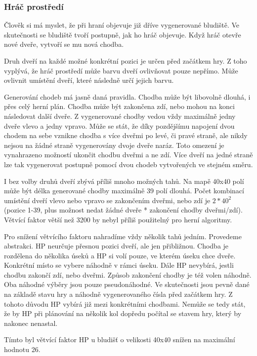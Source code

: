 \subsubsection{Hráč prostředí}

Člověk si má myslet, že při hraní objevuje již dříve vygenerované bludiště. Ve skutečnosti se bludiště tvoří postupně, jak ho hráč objevuje. Když hráč otevře nové dveře, vytvoří se mu nová chodba. 

Druh dveří na každé možné konkrétní pozici je určen před začátkem hry. Z toho vyplývá, že hráč prostředí může barvu dveří ovlivňovat pouze nepřímo. Může ovlivnit umístění dveří, které následně určí jejich barvu.

Generování chodeb má jasně daná pravidla. Chodba může být libovolně dlouhá, i přes celý herní plán. Chodba může být zakončena zdí, nebo mohou na konci následovat další dveře. Z vygenerované chodby vedou vždy maximálně jedny dveře vlevo a jedny vpravo. Může se stát, že díky pozdějšímu napojení dvou chodem na sebe vznikne chodba s více dveřmi po levé, či pravé straně, ale nikdy nejsou na žádné straně vygenerovány dvoje dveře naráz. Toto omezení je vynahrazeno možností ukončit chodbu dveřmi a ne zdí. Více dveří na jedné straně lze tak vygenerovat postupně pomocí dvou chodeb vytvořených ve stejném směru.

I bez volby druhů dveří zbývá příliš mnoho možných tahů. Na mapě 40x40 polí může být délka generované chodby maximálně 39 polí dlouhá. Počet kombinací umístění dveří vlevo nebo vpravo se zakončením dveřmi, nebo zdí je $2*40^2$ (pozice 1-39, plus možnost nedat žádné dveře * zakončení chodby dveřmi/zdí). Větvící faktor větší než 3200 by nebyl příliš použitelný pro herní algoritmy. 

Pro snížení větvícího faktoru nahradíme vždy několik tahů jedním. Provedeme abstrakci. HP neurčuje přesnou pozici dveří, ale jen přibližnou. Chodba je rozdělena do několika úseků a HP si volí pouze, ve kterém úseku chce dveře. Konkrétní místo se vybere náhodně v rámci úseku. Dále HP nevybírá, jestli chodbu zakončí zdí, nebo dveřmi. Způsob zakončení chodby je též volen náhodně. Oba náhodné výběry jsou pouze pseudonáhodné. Ve skutečnosti jsou pevně dané na základě stavu hry a náhodně vygenerovaného čísla před začátkem hry. Z tohoto důvodu HP vybírá již mezi konkrétními chodbami. Nemůže se tedy stát, že by HP při plánování na několik kol dopředu počítal se stavem hry, který by nakonec nenastal.

Tímto byl větvící faktor HP u bludišť o velikosti 40x40 snížen na maximální hodnotu 26.

